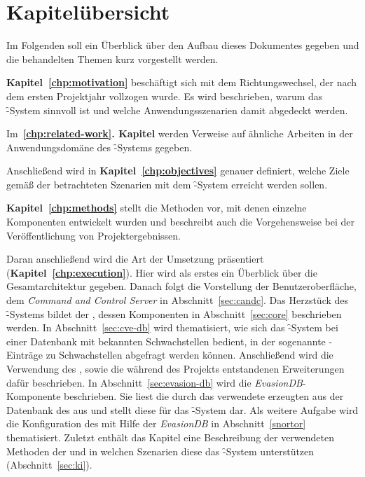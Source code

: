 
\section{Kapitelübersicht}
\label{sec:intro:chapters}

\authors{\JF \and \DH}{\LM \and \MW \and \BK}

Im Folgenden soll ein Überblick über den Aufbau dieses Dokumentes
gegeben und die behandelten Themen kurz vorgestellt werden.

\textbf{Kapitel~\ref{chp:motivation}} beschäftigt sich mit dem
Richtungswechsel, der nach dem ersten Projektjahr vollzogen
wurde. Es wird beschrieben, warum das \f-System sinnvoll ist und
welche Anwendungsszenarien damit abgedeckt werden.

Im~\textbf{\ref{chp:related-work}. Kapitel} werden Verweise auf ähnliche
Arbeiten in der Anwendungsdomäne des \f-Systems gegeben.

Anschließend wird in \textbf{Kapitel~\ref{chp:objectives}} genauer definiert,
welche Ziele gemäß der betrachteten Szenarien mit dem \f-System
erreicht werden sollen.

\textbf{Kapitel~\ref{chp:methods}} stellt die Methoden
vor, mit denen einzelne Komponenten entwickelt wurden und beschreibt
auch die Vorgehensweise bei der Veröffentlichung von
Projektergebnissen.

Daran anschließend wird die Art der Umsetzung präsentiert
(\textbf{Kapitel~\ref{chp:execution}}). Hier wird als erstes ein Überblick über
die Gesamtarchitektur gegeben. Danach folgt die Vorstellung der
Benutzeroberfläche, dem \textit{\f Command and Control Server} in
Abschnitt~\ref{sec:candc}. Das Herzstück des \f-Systems bildet der
\textit{}, dessen Komponenten in
Abschnitt~\ref{sec:core} beschrieben werden. In
Abschnitt~\ref{sec:cve-db} wird thematisiert, wie sich das \f-System
bei einer Datenbank mit bekannten Schwachstellen bedient, in der
sogenannte -Einträge zu Schwachstellen abgefragt werden
können. Anschließend wird die Verwendung des , sowie die
während des Projekts entstandenen Erweiterungen dafür beschrieben. In
Abschnitt~\ref{sec:evasion-db} wird die \textit{EvasionDB}-Komponente
beschrieben. Sie liest die durch das verwendete  erzeugten
 aus der Datenbank des  aus und
stellt diese für das \f-System dar. Als weitere Aufgabe wird die
Konfiguration des  mit Hilfe der \textit{EvasionDB} in
Abschnitt~\ref{snortor} thematisiert. Zuletzt enthält das Kapitel eine
Beschreibung der verwendeten Methoden der  und in welchen
Szenarien diese das \f-System unterstützen (Abschnitt~\ref{sec:ki}). 

